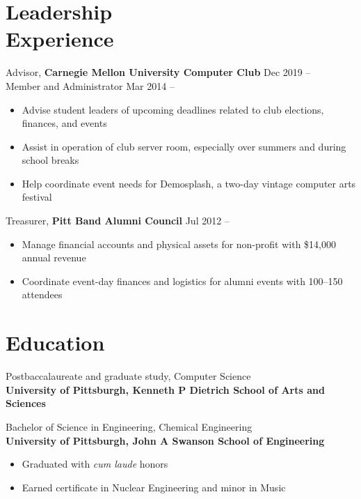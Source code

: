 \documentclass[11pt]{article}
\newcommand{\textdb}[1]{\fontseries{db}\selectfont#1\normalfont}
\newcommand{\present}{\phantom{Xxx 20XX}}
\begin{document}
\section{Leadership\\ Experience}

\textdb{
Advisor,
\textbf{Carnegie Mellon University Computer Club}
	\hfill Dec 2019 -- \present \\
}
\textdb{
Member and Administrator
	\hfill Mar 2014 -- \present
}
\begin{itemize}
	\item Advise student leaders of upcoming deadlines
		related to club elections, finances, and events
	\item Assist in operation of club server room,
		especially over summers and during school breaks
	\item Help coordinate event needs for Demosplash,
		a two-day vintage computer arts festival
\end{itemize}

\textdb{
Treasurer,
\textbf{Pitt Band Alumni Council}
	\hfill Jul 2012 -- \present
}
\begin{itemize}
	\item Manage financial accounts and physical assets
		for non-profit with \$14,000 annual revenue
	\item Coordinate event-day finances and logistics for alumni events with 100--150 attendees
\end{itemize}



\section{Education}

\textdb{
Postbaccalaureate and graduate study, Computer Science
	\\
}
\textbf{University of Pittsburgh, Kenneth P Dietrich School of Arts and Sciences}

\textdb{
Bachelor of Science in Engineering, Chemical Engineering
	\\
}
\textbf{University of Pittsburgh, John A Swanson School of Engineering}
\begin{itemize}
	\item Graduated with \emph{cum laude} honors
	\item Earned certificate in Nuclear Engineering and minor in Music
\end{itemize}
\end{document}
